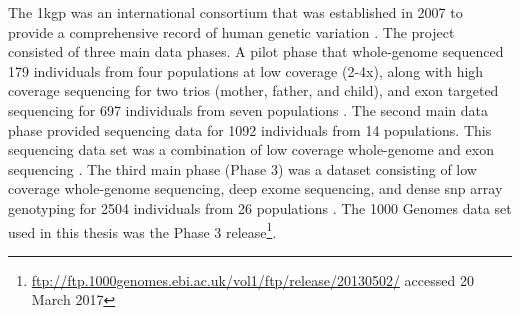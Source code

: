 \documentclass[]{report}
\begin{document}
The \glsdesc{1kgp} was an international consortium that was established
in 2007 to provide a comprehensive record of human genetic variation
\citep{siva2008}. The project consisted of three main data phases. A
pilot phase that whole-genome sequenced 179 individuals from four
populations at low coverage (2-4x), along with high coverage sequencing
for two trios (mother, father, and child), and exon targeted sequencing
for 697 individuals from seven populations \citep{1KGP2010}. The second
main data phase provided sequencing data for 1092 individuals from 14
populations. This sequencing data set was a combination of low coverage
whole-genome and exon sequencing \citep{1KGP2012}. The third main phase
(Phase 3) was a dataset consisting of low coverage whole-genome
sequencing, deep exome sequencing, and dense \gls{snp} array genotyping
for 2504 individuals from 26 populations \citep{1KGP2015snp}. The 1000
Genomes data set used in this thesis was the Phase 3 release\footnote{\url{ftp://ftp.1000genomes.ebi.ac.uk/vol1/ftp/release/20130502/}
  accessed 20 March 2017}.
\end{document}

